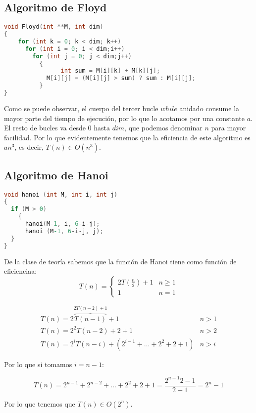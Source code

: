 \subsection{Algoritmo de Floyd}

\begin{lstlisting}[language=C]
void Floyd(int **M, int dim)
{
	for (int k = 0; k < dim; k++)
	  for (int i = 0; i < dim;i++)
	    for (int j = 0; j < dim;j++)
	      {
				int sum = M[i][k] + M[k][j];    	
		    M[i][j] = (M[i][j] > sum) ? sum : M[i][j];
	      }
}
\end{lstlisting}

Como se puede observar, el cuerpo del tercer bucle $while$ anidado consume la mayor parte del tiempo de ejecución, por lo que lo acotamos por una constante $a$. El resto de bucles va desde 0 hasta $dim$, que podemos denominar $n$ para mayor facilidad. Por lo que evidentemente tenemos que la eficiencia de este algoritmo es $an^3$, es decir, $T(n)\in O(n^3)$.


\subsection{Algoritmo de Hanoi}
\begin{lstlisting}[language=C]
void hanoi (int M, int i, int j)
{
  if (M > 0)
    {
      hanoi(M-1, i, 6-i-j);
      hanoi (M-1, 6-i-j, j);
  }
}

\end{lstlisting}

De la clase de teoría sabemos que la función de Hanoi tiene como función de eficienciaa:
\[
T(n)=\left\lbrace
\begin{array}{cc}
2T(\frac{n}{2})+1 & n \geq 1 \\
1 & n=1
\end{array}
\right.
\]

\[
\begin{array}{cc}
T(n)=2\overbrace{T(n-1)}^{2T(n-2)+1}+1 & n > 1 \\
T(n)=2^2T(n-2)+2+1 & n > 2 \\
T(n)=2^iT(n-i)+(2^{i-1}+\dots+2^2+2+1) & n > i
\end{array}
\]

Por lo que si tomamos $i=n-1$:

\[T(n)=2^{n-1}+2^{n-2}+\dots+2^2+2+1=\frac{2^{n-1}2-1}{2-1}=2^n-1\]

Por lo que tenemos que $T(n)\in O(2^n)$.